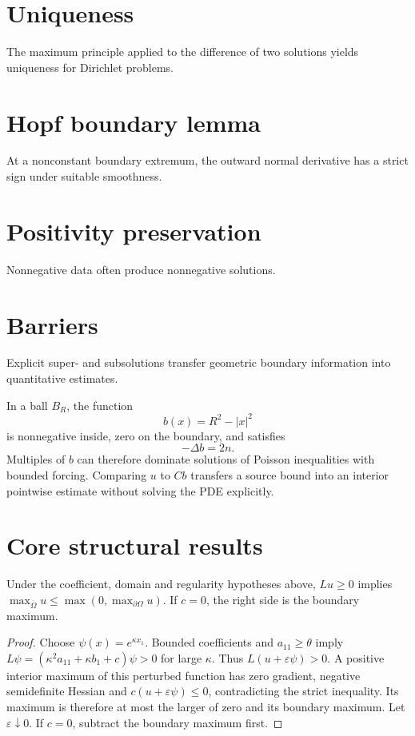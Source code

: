 \section{Uniqueness}
The maximum principle applied to the difference of two solutions yields uniqueness for Dirichlet problems.

\section{Hopf boundary lemma}
At a nonconstant boundary extremum, the outward normal derivative has a strict sign under suitable smoothness.

\section{Positivity preservation}
Nonnegative data often produce nonnegative solutions.

\section{Barriers}
Explicit super- and subsolutions transfer geometric boundary information into quantitative estimates.


\begin{example}\label{ex:iii27-expand-03}
In a ball \(B_R\), the function
\[
b(x)=R^2-|x|^2
\]
is nonnegative inside, zero on the boundary, and satisfies
\[
-\Delta b=2n.
\]
Multiples of \(b\) can therefore dominate solutions of Poisson inequalities
with bounded forcing. Comparing \(u\) to \(C b\) transfers a source bound into
an interior pointwise estimate without solving the PDE explicitly.
\end{example}
\section{Core structural results}

\begin{theorem}\label{thm:iii27-01}
Under the coefficient, domain and regularity hypotheses above, $Lu\ge0$ implies $\max_{\overline\Omega}u\le\max(0,\max_{\partial\Omega}u)$. If $c=0$, the right side is the boundary maximum.
\begin{proof}
Choose $\psi(x)=e^{\kappa x_1}$. Bounded coefficients and $a_{11}\ge\theta$ imply $L\psi=(\kappa^2a_{11}+\kappa b_1+c)\psi>0$ for large $\kappa$. Thus $L(u+\varepsilon\psi)>0$. A positive interior maximum of this perturbed function has zero gradient, negative semidefinite Hessian and $c(u+\varepsilon\psi)\le0$, contradicting the strict inequality. Its maximum is therefore at most the larger of zero and its boundary maximum. Let $\varepsilon\downarrow0$. If $c=0$, subtract the boundary maximum first.
\end{proof}
\end{theorem}

